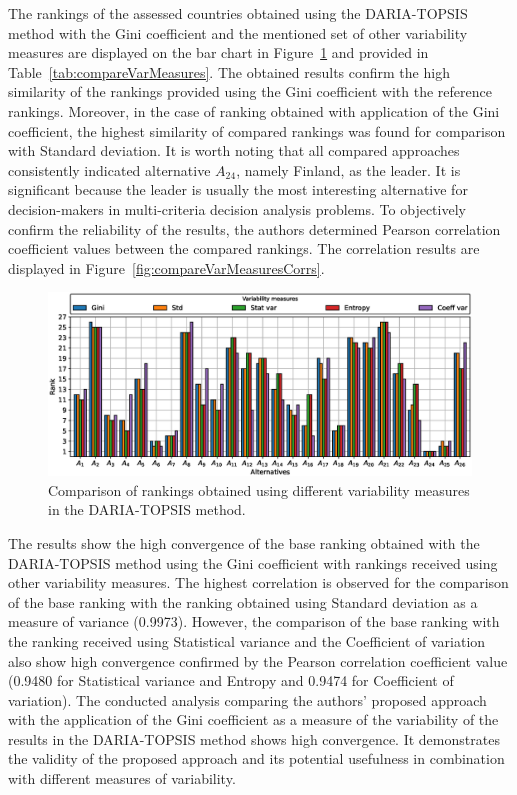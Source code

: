 \documentclass[final,5p,times,twocolumn,authoryear]{elsarticle}
\begin{document}
The rankings of the assessed countries obtained using the DARIA-TOPSIS method with the Gini coefficient and the mentioned set of other variability measures are displayed on the bar chart in Figure~\ref{fig:compareVarMeasures} and provided in Table~\ref{tab:compareVarMeasures}. The obtained results confirm the high similarity of the rankings provided using the Gini coefficient with the reference rankings. Moreover, in the case of ranking obtained with application of the Gini coefficient, the highest similarity of compared rankings was found for comparison with Standard deviation. It is worth noting that all compared approaches consistently indicated alternative $A_{24}$, namely Finland, as the leader. It is significant because the leader is usually the most interesting alternative for decision-makers in multi-criteria decision analysis problems. To objectively confirm the reliability of the results, the authors determined Pearson correlation coefficient values between the compared rankings. The correlation results are displayed in Figure~\ref{fig:compareVarMeasuresCorrs}. 
%
\begin{figure}[ht!]
    \centering
    \includegraphics[width=0.7\linewidth]{bar_chart_Variability_measures.eps}
    \caption{Comparison of rankings obtained using different variability measures in the DARIA-TOPSIS method.}
    \label{fig:compareVarMeasures}
\end{figure}
%
The results show the high convergence of the base ranking obtained with the DARIA-TOPSIS method using the Gini coefficient with rankings received using other variability measures. The highest correlation is observed for the comparison of the base ranking with the ranking obtained using Standard deviation as a measure of variance (0.9973). However, the comparison of the base ranking with the ranking received using Statistical variance and the Coefficient of variation also show high convergence confirmed by the Pearson correlation coefficient value (0.9480 for Statistical variance and Entropy and 0.9474 for Coefficient of variation). The conducted analysis comparing the authors' proposed approach with the application of the Gini coefficient as a measure of the variability of the results in the DARIA-TOPSIS method shows high convergence. It demonstrates the validity of the proposed approach and its potential usefulness in combination with different measures of variability.
\end{document}
